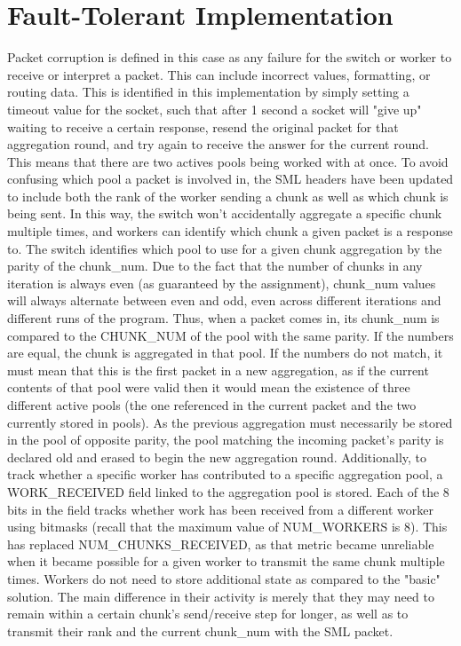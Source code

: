 \documentclass[a4paper,11pt]{article}
\begin{document}
\section{Fault-Tolerant Implementation}
Packet corruption is defined in this case as any failure for the switch or worker to receive or interpret a packet. This can include incorrect values, formatting, or routing data. This is identified in this implementation by simply setting a timeout value for the socket, such that after 1 second a socket will "give up" waiting to receive a certain response, resend the original packet for that aggregation round, and try again to receive the answer for the current round.\newline
This means that there are two actives pools being worked with at once. To avoid confusing which pool a packet is involved in, the SML headers have been updated to include both the rank of the worker sending a chunk as well as which chunk is being sent. In this way, the switch won't accidentally aggregate a specific chunk multiple times, and workers can identify which chunk a given packet is a response to.\newline 
The switch identifies which pool to use for a given chunk aggregation by the parity of the chunk\_num. Due to the fact that the number of chunks in any iteration is always even (as guaranteed by the assignment), chunk\_num values will always alternate between even and odd, even across different iterations and different runs of the program. Thus, when a packet comes in, its chunk\_num is compared to the CHUNK\_NUM of the pool with the same parity. If the numbers are equal, the chunk is aggregated in that pool. If the numbers do not match, it must mean that this is the first packet in a new aggregation, as if the current contents of that pool were valid then it would mean the existence of three different active pools (the one referenced in the current packet and the two currently stored in pools). As the previous aggregation must necessarily be stored in the pool of opposite parity, the pool matching the incoming packet's parity is declared old and erased to begin the new aggregation round.\newline
Additionally, to track whether a specific worker has contributed to a specific aggregation pool, a WORK\_RECEIVED field linked to the aggregation pool is stored. Each of the 8 bits in the field tracks whether work has been received from a different worker using bitmasks (recall that the maximum value of NUM\_WORKERS is 8). This has replaced NUM\_CHUNKS\_RECEIVED, as that metric became unreliable when it became possible for a given worker to transmit the same chunk multiple times.\newline
Workers do not need to store additional state as compared to the "basic" solution. The main difference in their activity is merely that they may need to remain within a certain chunk's send/receive step for longer, as well as to transmit their rank and the current chunk\_num with the SML packet.
\end{document}
